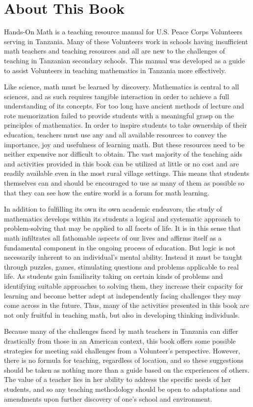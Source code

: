 \chapter{About This Book}
Hands-On Math is a teaching resource manual for U.S. Peace Corps Volunteers serving in Tanzania. Many of these Volunteers work in schools having insufficient math teachers and teaching resources and all are new to the challenges of teaching in Tanzanian secondary schools. This manual was developed as a guide to assist Volunteers in teaching mathematics in Tanzania more effectively.

Like science, math must be learned by discovery. Mathematics is central to all sciences, and as such requires tangible interaction in order to achieve a full understanding of its concepts. For too long have ancient methods of lecture and rote memorization failed to provide students with a meaningful grasp on the principles of mathematics. In order to inspire students to take ownership of their education, teachers must use any and all available resources to convey the importance, joy and usefulness of learning math. But these resources need to be neither expensive nor difficult to obtain. The vast majority of the teaching aids and activities provided in this book can be utilized at little or no cost and are readily available even in the most rural village settings. This means that students themselves can and should be encouraged to use as many of them as possible so that they can see how the entire world is a forum for math learning.

In addition to fulfilling its own its own academic endeavors, the study of mathematics develops within its students a logical and systematic approach to problem-solving that may be applied to all facets of life. It is in this sense that math infiltrates all fathomable aspects of our lives and affirms itself as a fundamental component in the ongoing process of education. But logic is not necessarily inherent to an individual's mental ability. Instead it must be taught through puzzles, games, stimulating questions and problems applicable to real life. As students gain familiarity taking on certain kinds of problems and identifying suitable approaches to solving them, they increase their capacity for learning and become better adept at independently facing challenges they may come across in the future. Thus, many of the activities presented in this book are not only fruitful in teaching math, but also in developing thinking individuals.

Because many of the challenges faced by math teachers in Tanzania can differ drastically from those in an American context, this book offers some possible strategies for meeting said challenges from a Volunteer's perspective. However, there is no formula for teaching, regardless of location, and so these suggestions should be taken as nothing more than a guide based on the experiences of others. The value of a teacher lies in her ability to address the specific needs of her students, and so any teaching methodology should be open to adaptations and amendments upon further discovery of one's school and environment.

